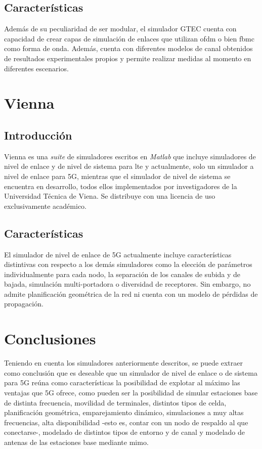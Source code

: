 \subsection{Características}
Además de su peculiaridad de ser modular, el simulador GTEC cuenta con capacidad de crear capas de simulación de enlaces que utilizan \ac{ofdm} o bien \ac{fbmc} como forma de onda. Además, cuenta con diferentes modelos de canal obtenidos de resultados experimentales propios y permite realizar medidas al momento en diferentes escenarios.

\section{Vienna}
\subsection{Introducción}
Vienna \cite{vienna} es una \textit{suite} de simuladores escritos en \textit{Matlab} que incluye simuladores de nivel de enlace y de nivel de sistema para \acs{lte} y actualmente, solo un simulador a nivel de enlace para 5G, mientras que el simulador de nivel de sistema se encuentra en desarrollo, todos ellos implementados por investigadores de la Universidad Técnica de Viena. Se distribuye con una licencia de uso exclusivamente académico.
\subsection{Características}
El simulador de nivel de enlace de 5G actualmente incluye características distintivas con respecto a los demás simuladores como la elección de parámetros individualmente para cada nodo, la separación de los canales de subida y de bajada, simulación multi-portadora o diversidad de receptores. Sin embargo, no admite planificación geométrica de la red ni cuenta con un modelo de pérdidas de propagación.

\section{Conclusiones}
Teniendo en cuenta los simuladores anteriormente descritos, se puede extraer como conclusión que es deseable que un simulador de nivel de enlace o de sistema para 5G reúna como características la posibilidad de explotar al máximo las ventajas que 5G ofrece, como pueden ser la posibilidad de simular estaciones base de distinta frecuencia, movilidad de terminales, distintos tipos de celda, planificación geométrica, emparejamiento dinámico, simulaciones a muy altas frecuencias, alta disponibilidad -esto es, contar con un nodo de respaldo al que conectarse-, modelado de distintos tipos de entorno y de canal y modelado de antenas de las estaciones base mediante \acs{mimo}.

